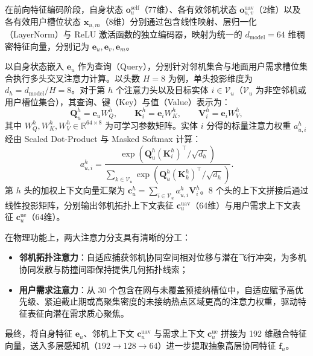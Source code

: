 在前向特征编码阶段，自身状态 $\mathbf o_u^{\mathrm{self}}$（77维）、各有效邻机状态 $\mathbf o_{u,v}^{\mathrm{uav}}$（2维）以及各有效用户槽位状态 $\mathbf x_{u,m}$（8维）分别通过包含线性映射、层归一化（LayerNorm）与 ReLU 激活函数的独立编码器，映射为统一的 $d_{\mathrm{model}}=64$ 维稠密特征向量，分别记为 $\mathbf e_u, \mathbf e_v, \mathbf e_m$。

以自身状态嵌入 $\mathbf e_u$ 作为查询（Query），分别针对邻机集合与地面用户需求槽位集合执行多头交叉注意力计算。以头数 $H=8$ 为例，单头投影维度为 $d_h = d_{\mathrm{model}} / H = 8$。对于第 $h$ 个注意力头以及目标实体 $i \in \mathcal V_u$（$\mathcal V_u$ 为非空邻机或用户槽位集合），其查询、键（Key）与值（Value）表示为：
\begin{equation}
    \mathbf Q_u^h = \mathbf e_u W_Q^h, \qquad 
    \mathbf K_i^h = \mathbf e_i W_K^h, \qquad 
    \mathbf V_i^h = \mathbf e_i W_V^h,
    \label{eq:qkv-proj}
\end{equation}
其中 $W_Q^h, W_K^h, W_V^h \in \mathbb R^{64 \times 8}$ 为可学习参数矩阵。实体 $i$ 分得的标量注意力权重 $a_{u,i}^h$ 经由 Scaled Dot-Product 与 Masked Softmax 计算：
\begin{equation}
    a_{u,i}^h = \frac{\exp\left(\mathbf Q_u^h (\mathbf K_i^h)^\top / \sqrt{d_h}\right)}{\sum_{k\in\mathcal V_u} \exp\left(\mathbf Q_u^h (\mathbf K_k^h)^\top / \sqrt{d_h}\right)}.
    \label{eq:ch3-cross-attention}
\end{equation}
第 $h$ 头的加权上下文向量汇聚为 $\mathbf c_u^h = \sum_{i\in\mathcal V_u} a_{u,i}^h \mathbf V_i^h$。8 个头的上下文拼接后通过线性投影矩阵，分别输出邻机拓扑上下文表征 $\mathbf c_u^{\mathrm{uav}}$（64维）与用户需求上下文表征 $\mathbf c_u^{\mathrm{ue}}$（64维）。

在物理功能上，两大注意力分支具有清晰的分工：
\begin{itemize}
    \item \textbf{邻机拓扑注意力}：自适应捕获邻机协同空间相对位移与潜在飞行冲突，为多机协同发散与防撞间距保持提供几何拓扑线索；
    \item \textbf{用户需求注意力}：从 30 个包含在网与未覆盖预接纳槽位中，自适应赋予高优先级、紧迫截止期或高聚集密度的未接纳热点区域更高的注意力权重，驱动特征表征向潜在需求质心聚焦。
\end{itemize}

最终，将自身特征 $\mathbf e_u$、邻机上下文 $\mathbf c_u^{\mathrm{uav}}$ 与需求上下文 $\mathbf c_u^{\mathrm{ue}}$ 拼接为 192 维融合特征向量，送入多层感知机（$192 \to 128 \to 64$）进一步提取抽象高层协同特征 $\mathbf f_u$。


